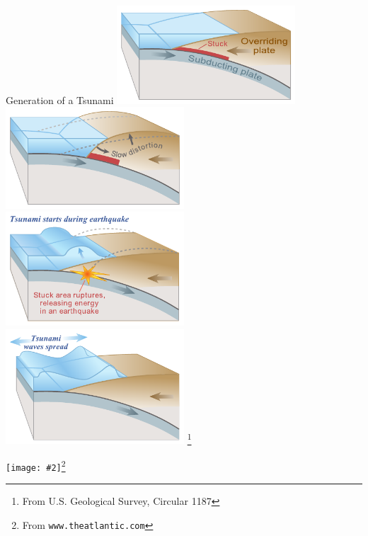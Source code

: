 \documentclass[8pt,sans,mathserif,aspectratio=43]{beamer}
\newcommand {\framedgraphic}[3]{
  \begin{frame}{#1}
    \begin{center}
      \texttt{[image: \#2]}\let\thefootnote\relax\footnote{#3}
    \end{center}
  \end{frame}
}
\begin{document}
\begin{frame}{Generation of a Tsunami}
  \includegraphics[width=0.5\textwidth]{figures/tsunami-gen-0.pdf}
  \includegraphics[width=0.5\textwidth]{figures/tsunami-gen-1.pdf}\\
  \includegraphics[width=0.5\textwidth]{figures/tsunami-gen-2.pdf}
  \includegraphics[width=0.5\textwidth]{figures/tsunami-gen-3.pdf}
  \let\thefootnote\relax\footnote{From U.S. Geological Survey, Circular 1187}
\end{frame}


\framedgraphic{} {figures/tsunami-hit.jpg} {From \texttt{www.theatlantic.com}}

\end{document}

